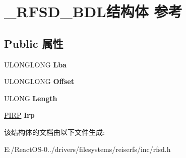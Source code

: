 \hypertarget{struct___r_f_s_d___b_d_l}{}\section{\+\_\+\+R\+F\+S\+D\+\_\+\+B\+D\+L结构体 参考}
\label{struct___r_f_s_d___b_d_l}
\subsection*{Public 属性}
\begin{DoxyCompactItemize}
\item 
\mbox{\label{struct___r_f_s_d___b_d_l_ad7ad7b736d69eb03a4f9eee2ee2f2d30}} 
U\+L\+O\+N\+G\+L\+O\+NG {\bfseries Lba}
\item 
\mbox{\label{struct___r_f_s_d___b_d_l_a6d4933e008746e3d0a2ab9a154e83f12}} 
U\+L\+O\+N\+G\+L\+O\+NG {\bfseries Offset}
\item 
\mbox{\label{struct___r_f_s_d___b_d_l_a8cce1a135f657de2955e7109269b9a90}} 
U\+L\+O\+NG {\bfseries Length}
\item 
\mbox{\label{struct___r_f_s_d___b_d_l_a04bef889884cbc8f98ef141aca5f668f}} 
\hyperlink{interfacevoid}{P\+I\+RP} {\bfseries Irp}
\end{DoxyCompactItemize}


该结构体的文档由以下文件生成\+:\begin{DoxyCompactItemize}
\item 
E\+:/\+React\+O\+S-\/0../drivers/filesystems/reiserfs/inc/rfsd.\+h\end{DoxyCompactItemize}
